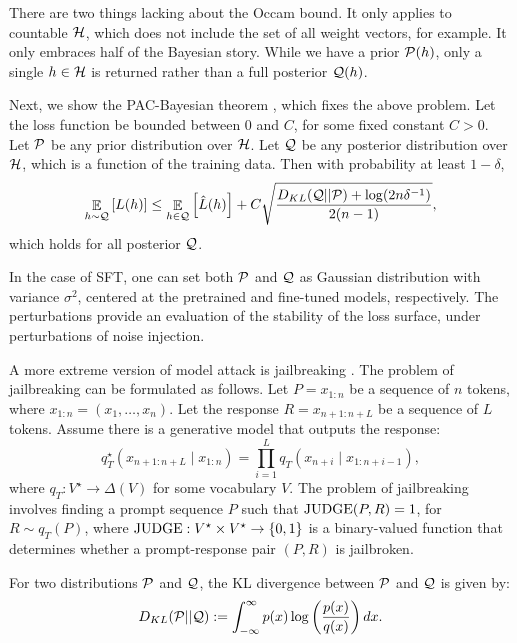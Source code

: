 There are two things lacking about the Occam bound.
It only applies to countable $\mathcal{H}$, which does not include the set of all weight vectors, for example.
It only embraces half of the Bayesian story.
While we have a prior $\mathcal{P}(h)$, only a single $h \in \mathcal{H}$ is returned rather than a full posterior $\mathcal{Q}(h)$.

Next, we show the PAC-Bayesian theorem \citep{mcallester1998some}, which fixes the above problem.
Let the loss function be bounded between $0$ and $C$, for some fixed constant $C > 0$.
Let $\mathcal{P}$ be any prior distribution over $\mathcal{H}$.
Let $\mathcal{Q}$ be any posterior distribution over $\mathcal{H}$, which is a function of the training data.
Then with probability at least $1 - \delta$,
\begin{align}
    \mathop{\mathbb{E}}_{h \sim \mathcal{Q}}\left[ L(h) \right] \le \mathop{\mathbb{E}}_{h \in \mathcal{Q}}\left[ \hat L(h) \right] + C\sqrt{\frac {D_{KL}(\mathcal{Q} || \mathcal{P}) + \log(2n \delta^{-1})} {2(n-1)}}, \label{eq_pac_bayes}
\end{align}
which holds for all posterior $\mathcal{Q}$.

\begin{example}
    In the case of SFT, one can set both $\mathcal{P}$ and $\mathcal{Q}$ as Gaussian distribution with variance $\sigma^2$, centered at the pretrained and fine-tuned models, respectively.
    The perturbations provide an evaluation of the stability of the loss surface, under perturbations of noise injection.

    A more extreme version of model attack is jailbreaking \citep{chao2025jailbreaking}.
    The problem of jailbreaking can be formulated as follows.
    Let $P = x_{1:n}$ be a sequence of $n$ tokens, where $x_{1:n} = (x_1, \dots, x_n)$.
    Let the response $R = x_{n+1 : n+L}$ be a sequence of $L$ tokens.
    Assume there is a generative model that outputs the response:
    \[ q^{\star}_T(x_{n+1: n+L} \mid x_{1:n}) = \prod_{i=1}^L q_T(x_{n+i} \mid x_{1: n+i-1}), \]
    where $q_T: V^{\star} \rightarrow \Delta(V)$ for some vocabulary $V$.
    The problem of jailbreaking involves finding a prompt sequence $P$ such that $\textup{JUDGE}(P, R) = 1$, for $R \sim q_T(P)$, where $\textup{JUDGE}: V^{\star} \times V^{\star} \rightarrow \left\{0, 1\right\}$ is a binary-valued function that determines whether a prompt-response pair $(P, R)$ is jailbroken.
\end{example}

\begin{definition}[KL divergence]
    For two distributions $\mathcal{P}$ and $\mathcal{Q}$, the KL divergence between $\mathcal{P}$ and $\mathcal{Q}$ is given by:
    \begin{align}\label{eq_kl}
        D_{KL}(\mathcal{P} || \mathcal{Q}) := \int_{-\infty}^{\infty} p(x) \log\left( \frac{p (x) } {q(x)} \right) dx.
    \end{align}
\end{definition}

